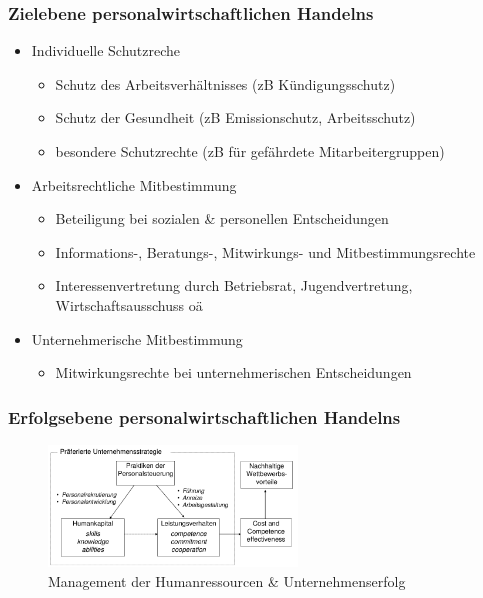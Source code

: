 \documentclass[11pt]{article}
\begin{document}
\subsubsection{Zielebene personalwirtschaftlichen Handelns}
\label{sec:org49059f4}
\begin{itemize}
\item Individuelle Schutzreche
\begin{itemize}
\item Schutz des Arbeitsverhältnisses (zB Kündigungsschutz)
\item Schutz der Gesundheit (zB Emissionschutz, Arbeitsschutz)
\item besondere Schutzrechte (zB für gefährdete Mitarbeitergruppen)
\end{itemize}
\item Arbeitsrechtliche Mitbestimmung
\begin{itemize}
\item Beteiligung bei sozialen \& personellen Entscheidungen
\item Informations-, Beratungs-, Mitwirkungs- und Mitbestimmungsrechte
\item Interessenvertretung durch Betriebsrat, Jugendvertretung, Wirtschaftsausschuss oä
\end{itemize}
\item Unternehmerische Mitbestimmung
\begin{itemize}
\item Mitwirkungsrechte bei unternehmerischen Entscheidungen
\end{itemize}
\end{itemize}

\subsubsection{Erfolgsebene personalwirtschaftlichen Handelns}
\label{sec:org4c4c0e0}
\begin{figure}[htbp]
\centering
\includegraphics[width=250px]{./pictures/perserfolg.png}
\caption{Management der Humanressourcen \& Unternehmenserfolg}
\end{figure} 
\end{document}
